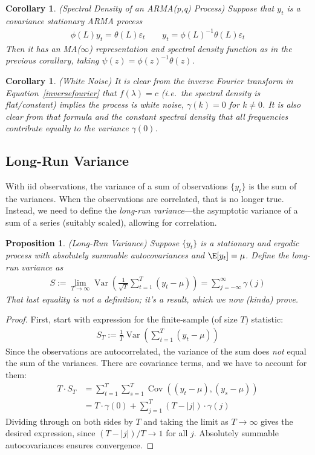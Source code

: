 \documentclass[12pt]{article}
\theoremstyle{plain}
\newtheorem{prop}[thm]{Proposition}
\newtheorem{cor}[thm]{Corollary}
\theoremstyle{definition}
\theoremstyle{remark}
\newcommand{\ra}{\rightarrow}
\newcommand{\Cov}{\operatorname{Cov}}
\newcommand{\Var}{\operatorname{Var}}
\newcommand{\sumtT}{\sum^T_{t=1}}
\newcommand{\limT}{\lim_{T\rightarrow\infty}}
\begin{document}
\begin{cor}\emph{(Spectral Density of an ARMA(p,q) Process)}
Suppose that $y_t$ is a covariance stationary ARMA process
\begin{align*}
  \phi(L) y_t = \theta(L)\varepsilon_t
  \qquad
  y_t = \phi(L)^{-1}\theta(L)\varepsilon_t
\end{align*}
Then it has an MA($\infty$) representation and spectral density
function as in the previous corallary, taking
$\psi(z) = \phi(z)^{-1}\theta(z)$.
\end{cor}



\begin{cor}\emph{(White Noise)}
It is clear from the inverse Fourier transform in
Equation~\ref{inversefourier} that $f(\lambda)=c$ (i.e.\ the spectral
density is flat/constant) implies the process is white noise,
$\gamma(k)=0$ for $k\neq 0$.
It is also clear from that formula and the constant spectral density
that \emph{all frequencies} contribute equally to the variance
$\gamma(0)$.
\end{cor}


\clearpage
\subsection{Long-Run Variance}

With iid observations, the variance of a sum of observations
$\{y_t\}$ is the sum of the variances. When the observations are
correlated, that is no longer true. Instead, we need to define the
\emph{long-run variance}---the asymptotic variance of a sum of a series
(suitably scaled), allowing for correlation.

\begin{prop}\emph{(Long-Run Variance)}
Suppose $\{y_t\}$ is a stationary and ergodic process with absolutely
summable autocovariances and $\E[y_t]=\mu$. Define the
\emph{long-run variance} as
\begin{align}
  S := \limT \Var\left(\frac{1}{\sqrt{T}}\sumtT (y_t-\mu)\right)
  = \sum_{j=-\infty}^\infty \gamma(j)
  \label{clt:lrvar}
\end{align}
That last equality is not a definition; it's a result, which we now
(kinda) prove.
\end{prop}
\begin{proof}
First, start with expression for the finite-sample (of size $T$)
statistic:
\begin{align*}
 S_T
 := \frac{1}{T}\Var\left(\sumtT (y_t-\mu)\right)
\end{align*}
Since the observations are autocorrelated, the variance of the sum does
\emph{not} equal the sum of the variances. There are covariance terms,
and we have to account for them:
\begin{align*}
 T \cdot S_T
 &= \sumtT \sum_{s=1}^T\Cov((y_t-\mu), (y_s-\mu)) \\
 &= T\cdot \gamma(0) + \sum_{j=1}^T (T-|j|)\cdot \gamma(j)
\end{align*}
Dividing through on both sides by $T$ and taking the limit as
$T\ra\infty$ gives the desired expression, since $(T-|j|)/T \ra 1$ for
all $j$. Absolutely summable autocovariances ensures convergence.
\end{proof}
\end{document}
